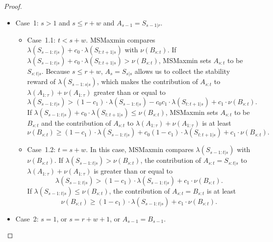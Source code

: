 \documentclass[11pt,a4paper]{article}
\renewcommand{\leq}{\leqslant}
\renewcommand{\geq}{\geqslant}
\begin{document}
\begin{proof}
\begin{itemize}
	
\item Case~1: $s > 1$ and $s \leq r+w$ and $A_{s-1} = S_{s-1|r}$. %

\begin{itemize}
	\item Case~1.1: $t < s+w$.   MSMaxmin compares $\lambda(S_{s-1:t|s}) + c_0\cdot\lambda(S_{t:t+1|s})$ with $\nu(B_{s:t})$. If $\lambda(S_{s-1:t|s}) + c_0\cdot\lambda(S_{t:t+1|s}) > \nu(B_{s:t})$, MSMaxmin sets $A_{s:t}$ to be $S_{s:t|s}$.  Because $s \leq r+w$, $A_{s} = S_{s|s}$ allows us to collect the stability reward of $\lambda(S_{s-1:s|s})$, which makes the contribution of $A_{s:t}$ to $\lambda(A_{1:\tau}) + \nu(A_{1:\tau})$ greater than or equal to
	\begin{equation} 
			\lambda(S_{s-1:t|s}) > (1-c_1)\cdot\lambda(S_{s-1:t|s})  - c_0c_1\cdot\lambda(S_{t:t+1|s}) + c_1\cdot\nu(B_{s:t}).    \label{eq:thm0}
	\end{equation}
	If $\lambda(S_{s-1:t|s}) + c_0\cdot\lambda(S_{t:t+1|s}) \leq \nu(B_{s:t})$, MSMaxmin sets $A_{s:t}$ to be $B_{s:t}$ and the contribution of $A_{s:t}$ to $\lambda(A_{1:\tau}) + \nu(A_{1:\tau})$ is at least 
	\begin{equation}
			\nu(B_{s:t}) \geq (1-c_1)\cdot\lambda(S_{s-1:t|s}) + c_0(1- c_1)\cdot\lambda(S_{t:t+1|s}) + c_1\cdot\nu(B_{s:t}).    \label{eq:thm1}
	\end{equation}

	\item Case~1.2: $t = s+w$.  In this case, MSMaxmin compares $\lambda(S_{s-1:t|s})$ with $\nu(B_{s:t})$.  If $\lambda(S_{s-1:t|s}) > \nu(B_{s:t})$, the contribution of $A_{s:t} = S_{s:t|s}$ to $\lambda(A_{1:\tau}) + \nu(A_{1:\tau})$ is greater than or equal to
		\begin{equation} 
		\lambda(S_{s-1:t|s}) > (1-c_1)\cdot\lambda(S_{s-1:t|s}) + c_1\cdot\nu(B_{s:t}).    \label{eq:thm2}
	\end{equation}
	If $\lambda(S_{s-1:t|s}) \leq \nu(B_{s:t})$, the contribution of $A_{s:t} = B_{s:t}$ is at least 
	\begin{equation}
		\nu(B_{s:t}) \geq (1-c_1)\cdot\lambda(S_{s-1:t|s}) + c_1\cdot\nu(B_{s:t}).    \label{eq:thm3}
	\end{equation}
	
\end{itemize}

\item Case~2: $s = 1$, or $s = r+w+1$, or $A_{s-1} = B_{s-1}$.  


\end{itemize}
\end{proof}
\end{document}
